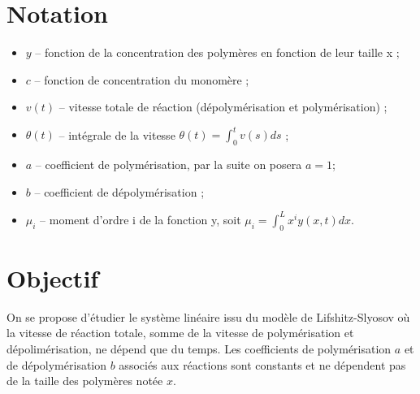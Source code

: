\documentclass[a4paper]{article}
\newcommand{\pol}{a}
\newcommand{\dep}{b}
\begin{document}
\section{Notation}

\begin{itemize}
\item $y$ -- fonction de la concentration des polymères en fonction de leur taille x ;
\item $c$ -- fonction de concentration du monomère ;
\item $v(t)$ -- vitesse totale de réaction (dépolymérisation et polymérisation) ;
\item $\theta(t)$ -- intégrale de la vitesse $\theta(t)=\int_0^t v(s)ds$ ;
\item $\pol$ -- coefficient de polymérisation, par la suite on posera $\pol=1$;
\item $\dep$ -- coefficient de dépolymérisation ;
\item $\mu_i$ -- moment d'ordre i de la fonction y, soit $\mu_i = \int_0^L x^i y(x,t)dx$.
\end{itemize}


\section{Objectif}

On se propose d'étudier le système linéaire issu du modèle de Lifshitz-Slyosov où la vitesse de réaction totale, 
somme de la vitesse de polymérisation et dépolimérisation, ne dépend que du temps. 
Les coefficients de polymérisation $\pol$ et de dépolymérisation $\dep$ associés aux réactions sont constants 
et ne dépendent pas de la taille des polymères notée $x$. 
\end{document}
